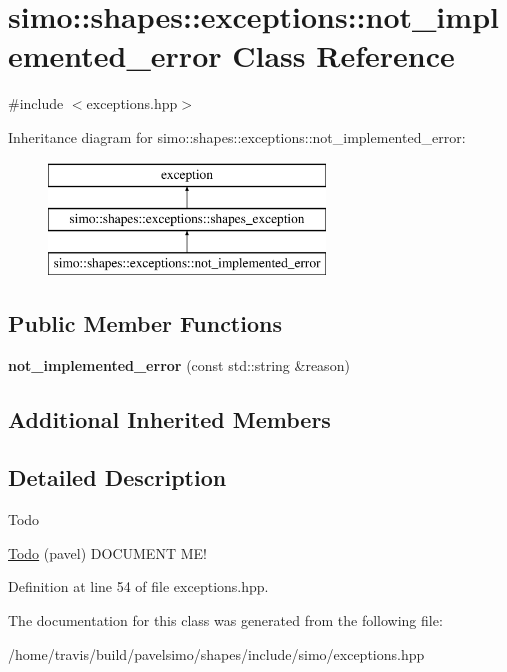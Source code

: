 \hypertarget{classsimo_1_1shapes_1_1exceptions_1_1not__implemented__error}{\section{simo\-:\-:shapes\-:\-:exceptions\-:\-:not\-\_\-implemented\-\_\-error Class Reference}
\label{classsimo_1_1shapes_1_1exceptions_1_1not__implemented__error}
}


{\ttfamily \#include $<$exceptions.\-hpp$>$}

Inheritance diagram for simo\-:\-:shapes\-:\-:exceptions\-:\-:not\-\_\-implemented\-\_\-error\-:\begin{figure}[H]
\begin{center}
\leavevmode
\includegraphics[height=3.000000cm]{classsimo_1_1shapes_1_1exceptions_1_1not__implemented__error}
\end{center}
\end{figure}
\subsection*{Public Member Functions}
\begin{DoxyCompactItemize}
\item 
\hypertarget{classsimo_1_1shapes_1_1exceptions_1_1not__implemented__error_aee69f5e86b7f01af95e7fedda1b9e10c}{{\bfseries not\-\_\-implemented\-\_\-error} (const std\-::string \&reason)}\label{classsimo_1_1shapes_1_1exceptions_1_1not__implemented__error_aee69f5e86b7f01af95e7fedda1b9e10c}

\end{DoxyCompactItemize}
\subsection*{Additional Inherited Members}


\subsection{Detailed Description}
\begin{DoxyRefDesc}{Todo}
\item[\hyperlink{todo__todo000002}{Todo}](pavel) D\-O\-C\-U\-M\-E\-N\-T M\-E! \end{DoxyRefDesc}


Definition at line 54 of file exceptions.\-hpp.



The documentation for this class was generated from the following file\-:\begin{DoxyCompactItemize}
\item 
/home/travis/build/pavelsimo/shapes/include/simo/exceptions.\-hpp\end{DoxyCompactItemize}
